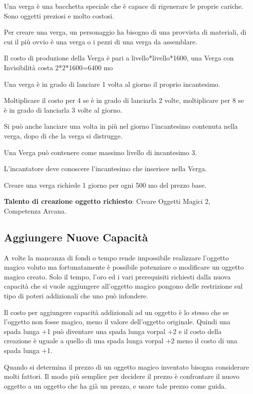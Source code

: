 \begin{multicols}{2}
Una verga è una bacchetta speciale che è capace di rigenerare le proprie cariche. Sono oggetti preziosi e molto costosi.

Per creare una verga, un personaggio ha bisogno di una provvista di materiali, di cui il più ovvio è una verga o i pezzi di una verga da assemblare.

\medskip

Il costo di produzione della Verga è pari a livello*livello*1600, una Verga con Invisibilità costa 2*2*1600=6400 mo

\bigskip

Una verga è in grado di lanciare 1 volta al giorno il proprio incantesimo.

Moltiplicare il costo per 4 se è in grado di lanciarla 2 volte, moltiplicare per 8 se è in grado di lanciarla 3 volte al giorno.

Si può anche lanciare una volta in più nel giorno l'incantesimo contenuta nella verga, dopo di che la verga si distrugge.

Una Verga può contenere come massimo livello di incantesimo 3.

L'incantatore deve conoscere l'incantesimo che inserisce nella Verga.

Creare una verga richiede 1 giorno per ogni 500 mo del prezzo base.

\textbf{Talento di creazione oggetto richiesto}: Creare Oggetti Magici 2, Competenza Arcana.

\subsection{Aggiungere Nuove Capacità}\label{aggiungerecapacitamagiche}

A volte la mancanza di fondi o tempo rende impossibile realizzare l'oggetto magico voluto ma fortunatamente è possibile potenziare o modificare un oggetto magico creato. Solo il tempo, l'oro ed i vari prerequisiti richiesti dalla nuova capacità che si vuole aggiungere all'oggetto magico pongono delle restrizione sul tipo di poteri addizionali che uno può infondere.

Il costo per aggiungere capacità addizionali ad un oggetto è lo stesso che se l'oggetto non fosse magico, meno il valore dell'oggetto originale. Quindi una spada lunga +1 può diventare una spada lunga vorpal +2 e il costo della creazione è uguale a quello di una spada lunga vorpal +2 meno il costo di una spada lunga +1.

Quando si determina il prezzo di un oggetto magico inventato bisogna considerare molti fattori. Il modo più semplice per decidere il prezzo è confrontare il nuovo oggetto a un oggetto che ha già un prezzo, e usare tale prezzo come guida.

\end{multicols}

